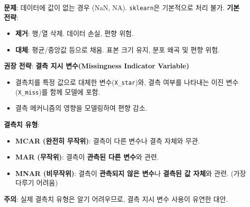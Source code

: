 \documentclass[11pt,a4paper]{article}
\theoremstyle{definition}
\begin{document}
\begin{summarybox}[title={결측치 처리 전략}]
\textbf{문제}: 데이터에 값이 없는 경우 (NaN, NA). \texttt{sklearn}은 기본적으로 처리 불가.
\textbf{기본 전략}:
\begin{itemize}
    \item \textbf{제거}: 행/열 삭제. 데이터 손실, 편향 위험.
    \item \textbf{대체}: 평균/중앙값 등으로 채움. 표본 크기 유지, 분포 왜곡 및 편향 위험.
\end{itemize}
\textbf{권장 전략}: \textbf{결측 지시 변수(Missingness Indicator Variable)}
\begin{itemize}
    \item 결측치를 특정 값으로 대체한 변수(\texttt{X_star})와, 결측 여부를 나타내는 이진 변수(\texttt{X_miss})를 함께 모델에 포함.
    \item 결측 메커니즘의 영향을 모델링하여 편향 감소.
\end{itemize}
\textbf{결측치 유형}:
\begin{itemize}
    \item \textbf{MCAR (완전히 무작위)}: 결측이 다른 변수나 결측 자체와 무관.
    \item \textbf{MAR (무작위)}: 결측이 \textbf{관측된 다른 변수}와 관련.
    \item \textbf{MNAR (비무작위)}: 결측이 \textbf{관측되지 않은 변수}나 \textbf{결측된 값 자체}와 관련. (가장 다루기 어려움)
\end{itemize}
\textbf{주의}: 실제 결측치 유형은 알기 어려우므로, 결측 지시 변수 사용이 유연한 대안.
\end{summarybox}
\end{document}
